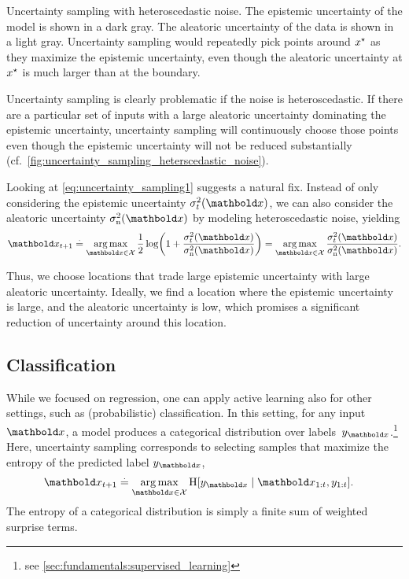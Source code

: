 \begin{marginfigure}
  \caption{Uncertainty sampling with heteroscedastic noise.
  The epistemic uncertainty of the model is shown in a dark gray.
  The aleatoric uncertainty of the data is shown in a light gray.
  Uncertainty sampling would repeatedly pick points around $x^\star$ as they maximize the epistemic uncertainty, even though the aleatoric uncertainty at $x^\star$ is much larger than at the boundary.}\label{fig:uncertainty_sampling_heterscedastic_noise}
\end{marginfigure}

Uncertainty sampling is clearly problematic if the noise is heteroscedastic.
If there are a particular set of inputs with a large aleatoric uncertainty dominating the epistemic uncertainty, uncertainty sampling will continuously choose those points even though the epistemic uncertainty will not be reduced substantially (cf.~\cref{fig:uncertainty_sampling_heterscedastic_noise}).

Looking at \cref{eq:uncertainty_sampling1} suggests a natural fix.
Instead of only considering the epistemic uncertainty $\sigma_t^2(\vx)$, we can also consider the aleatoric uncertainty $\sigman^2(\vx)$ by modeling heteroscedastic noise, yielding \begin{align}
  \vx_{t+1} \defeq \argmax_{\vx \in \spX} \frac{1}{2} \log\parentheses*{1 + \frac{\sigma_t^2(\vx)}{\sigman^2(\vx)}} = \argmax_{\vx \in \spX} \frac{\sigma_t^2(\vx)}{\sigman^2(\vx)}.
\end{align}

Thus, we choose locations that trade large epistemic uncertainty with large aleatoric uncertainty.
Ideally, we find a location where the epistemic uncertainty is large, and the aleatoric uncertainty is low, which promises a significant reduction of uncertainty around this location.

\subsection{Classification}\label{sec:active_learning:optimizing_mutual_information:classification}

While we focused on regression, one can apply active learning also for other settings, such as (probabilistic) classification.
In this setting, for any input $\vx$, a model produces a categorical distribution over labels~$y_{\vx}$.\footnote{see \cref{sec:fundamentals:supervised_learning}}
Here, uncertainty sampling corresponds to selecting samples that maximize the entropy of the predicted label $y_{\vx}$, \begin{align}
  \vx_{t+1} &\defeq \argmax_{\vx \in \spX} \H{y_{\vx} \mid \vx_{1:t}, y_{1:t}}. \label{eq:uncertainty_sampling_classification1}
\end{align}
The entropy of a categorical distribution is simply a finite sum of weighted surprise terms.

